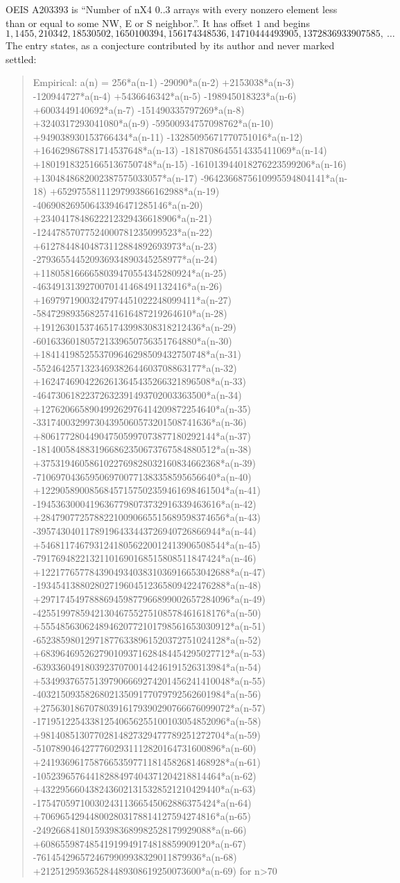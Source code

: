 \documentclass[11pt,a4paper]{article}
\theoremstyle{plain}
\theoremstyle{definition}
\begin{document}
OEIS A203393 is ``Number of nX4 0..3 arrays with every nonzero element less than or equal to some NW, E or S neighbor.''. It has offset $1$ and begins
\[
1, 1455, 210342, 18530502, 1650100394, 156174348536, 14710444493905, 1372836933907585,\ \dots
\]
The entry states, as a conjecture contributed by its author and never marked settled:
\begin{quote}
Empirical: a(n) = 256*a(n-1) -29090*a(n-2) +2153038*a(n-3) -120944727*a(n-4) +5436646342*a(n-5) -198945018323*a(n-6) +6003449140692*a(n-7) -151490335797269*a(n-8) +3240317293041080*a(n-9) -59500934757098762*a(n-10) +949038930153766434*a(n-11) -13285095671770751016*a(n-12) +164629867881714537648*a(n-13) -1818708645514335411069*a(n-14) +18019183251665136750748*a(n-15) -161013944018276223599206*a(n-16) +1304848682002387575033057*a(n-17) -9642366875610995594804141*a(n-18) +65297558111297993866162988*a(n-19) -406908269506433946471285146*a(n-20) +2340417848622212329436618906*a(n-21) -12447857077524000781235099523*a(n-22) +61278448404873112884892693973*a(n-23) -279365544520936934890345258977*a(n-24) +1180581666658039470554345280924*a(n-25) -4634913139270070141468491132416*a(n-26) +16979719003247974451022248099411*a(n-27) -58472989356825741616487219264610*a(n-28) +191263015374651743998308318212436*a(n-29) -601633601805721339650756351764880*a(n-30) +1841419852553709646298509432750748*a(n-31) -5524642571323469382644603708863177*a(n-32) +16247469042262613645435266321896508*a(n-33) -46473061822372632391493702003363500*a(n-34) +127620665890499262976414209872254640*a(n-35) -331740032997304395060573201508741636*a(n-36) +806177280449047505997073877180292144*a(n-37) -1814005848831966862350673767584880512*a(n-38) +3753194605861022769828032160834662368*a(n-39) -7106970436595069700771383358595656640*a(n-40) +12290589008568457157502359461698461504*a(n-41) -19453630004196367798073732916339463616*a(n-42) +28479077257882210090665515689598374656*a(n-43) -39574304011789196433443726940726866944*a(n-44) +54681174679312418056220012413906508544*a(n-45) -79176948221321101690168515808511847424*a(n-46) +122177657784390493403831036916653042688*a(n-47) -193454138802802719604512365809422476288*a(n-48) +297174549788869459877966899002657284096*a(n-49) -425519978594213046755275108578461618176*a(n-50) +555485630624894620772101798561653030912*a(n-51) -652385980129718776338961520372751024128*a(n-52) +683964695262790109371628484454295027712*a(n-53) -639336049180392370700144246191526313984*a(n-54) +534993765751397906669274201456241410048*a(n-55) -403215093582680213509177079792562601984*a(n-56) +275630186707803916179390290766676099072*a(n-57) -171951225433812540656255100103054852096*a(n-58) +98140851307702814827329477789251272704*a(n-59) -51078904642777602931112820164731600896*a(n-60) +24193696175876653597711814582681468928*a(n-61) -10523965764418288497404371204218814464*a(n-62) +4322956604382436021315328521210429440*a(n-63) -1754705971003024311366545062886375424*a(n-64) +706965429448002803178814127594274816*a(n-65) -249266841801593983689982528179929088*a(n-66) +60865598748541919949174818859909120*a(n-67) -7614542965724679909938329011879936*a(n-68) +212512959365284489308619250073600*a(n-69) for n>70
\end{quote}
\end{document}

